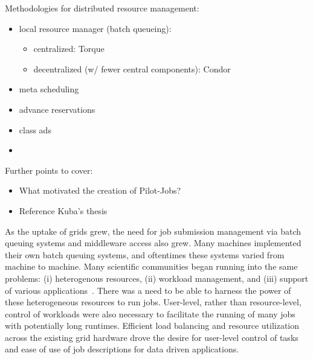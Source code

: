 \documentclass{sig-alternate}
\begin{document}
Methodologies for distributed resource management:
\begin{itemize}
    \item local resource manager (batch queueing):
    \begin{itemize}
        \item centralized: Torque
        \item decentralized (w/ fewer central components): Condor
    \end{itemize} 
    \item meta scheduling
    \item advance reservations
    \item class ads
    \item \pilots
\end{itemize}

Further points to cover:
\begin{itemize}
\item What motivated the creation of Pilot-Jobs?
\item Reference Kuba's thesis
\end{itemize}

As the uptake of grids grew, the need for job submission management
via batch queuing systems and middleware access also grew. Many
machines implemented their own batch queuing systems, and oftentimes
these systems varied from machine to machine. Many scientific
communities began running into the same problems: (i) heterogenous
resources, (ii) workload management, and (iii) support of various
applications~\cite{cern-slides}. There was a need to be able to
harness the power of these heterogeneous resources to run
jobs. User-level, rather than resource-level, control of workloads
were also necessary to facilitate the running of many jobs with
potentially long runtimes. 
Efficient load balancing and resource utilization across the existing
grid hardware  drove the desire for user-level control of tasks and ease
of use of job descriptions for data driven
applications. 
\end{document}

